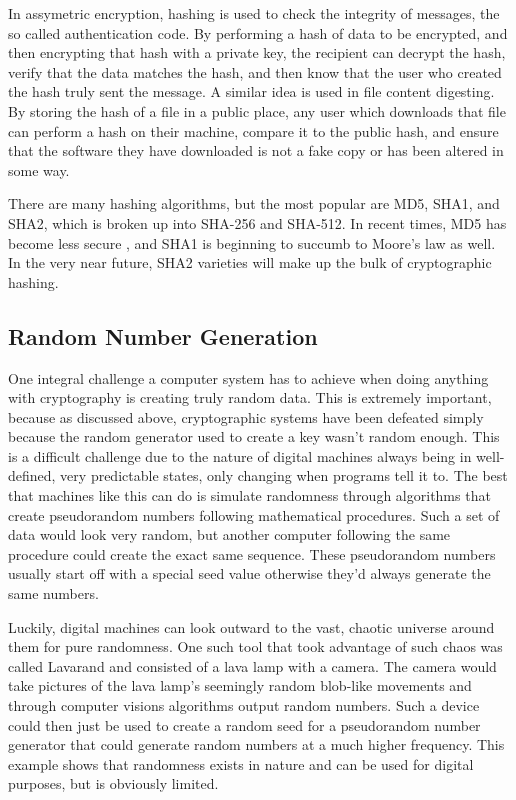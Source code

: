 \documentclass[journal]{IEEEtran}
\begin{document}
In assymetric encryption, hashing is used to check the integrity of messages, the so called authentication code.  By performing a hash of data to be encrypted, and then encrypting that hash with a private key, the recipient can decrypt the hash, verify that the data matches the hash, and then know that the user who created the hash truly sent the message.  A similar idea is used in file content digesting.  By storing the hash of a file in a public place, any user which downloads that file can perform a hash on their machine, compare it to the public hash, and ensure that the software they have downloaded is not a fake copy or has been altered in some way.

There are many hashing algorithms, but the most popular are MD5, SHA1, and SHA2, which is broken up into SHA-256 and SHA-512.  In recent times, MD5 has become less secure \cite{hashRainbow} \cite{hashBotnet}, and SHA1 is beginning to succumb to Moore's law as well.  In the very near future, SHA2 varieties will make up the bulk of cryptographic hashing.



\subsection{Random Number Generation}

One integral challenge a computer system has to achieve when doing anything with cryptography is creating truly random data.  This is extremely important, because as discussed above, cryptographic systems have been defeated simply because the random generator used to create a key wasn’t random enough.  This is a difficult challenge due to the nature of digital machines always being in well-defined, very predictable states, only changing when programs tell it to.  The best that machines like this can do is simulate randomness through algorithms that create pseudorandom numbers following mathematical procedures.  Such a set of data would look very random, but another computer following the same procedure could create the exact same sequence.  These pseudorandom numbers usually start off with a special seed value otherwise they’d always generate the same numbers.

Luckily, digital machines can look outward to the vast, chaotic universe around them for pure randomness.  One such tool that took advantage of such chaos was called Lavarand and consisted of a lava lamp with a camera.  The camera would take pictures of the lava lamp’s seemingly random blob-like movements and through computer visions algorithms output random numbers.  Such a device could then just be used to create a random seed for a pseudorandom number generator that could generate random numbers at a much higher frequency.  This example shows that randomness exists in nature and can be used for digital purposes, but is obviously limited.  
\end{document}
